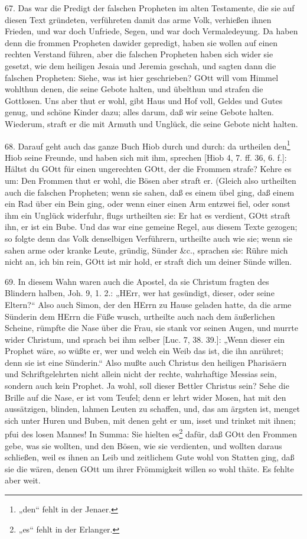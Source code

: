67. Das war die Predigt der falschen Propheten im alten Testamente, die sie auf diesen Text gründeten, verführeten damit das arme Volk, verhießen ihnen Frieden, und war doch Unfriede, Segen, und war doch Vermaledeyung. Da haben denn die frommen Propheten dawider gepredigt, haben sie wollen auf einen rechten Verstand führen, aber die falschen Propheten haben sich wider sie gesetzt, wie dem heiligen Jesaia und Jeremia geschah, und sagten dann die falschen Propheten: Siehe, was ist hier geschrieben? GOtt will vom Himmel wohlthun denen, die seine Gebote halten, und übelthun und strafen die Gottlosen. Uns aber thut er wohl, gibt Haus und Hof voll, Geldes und Gutes genug, und schöne Kinder dazu; alles darum, daß wir seine Gebote halten. Wiederum, straft er die mit Armuth und Unglück, die seine Gebote nicht halten.

68. Darauf geht auch das ganze Buch Hiob durch und durch: da urtheilen den\footnote{„den“ fehlt in der Jenaer.} Hiob seine Freunde, und haben sich mit ihm, sprechen [Hiob 4, 7. ff. 36, 6. f.]: Hältst du GOtt für einen ungerechten GOtt, der die Frommen strafe? Kehre es um: Den Frommen thut er wohl, die Bösen aber straft er. (Gleich also urtheilten auch die falschen Propheten; wenn sie sahen, daß es einem übel ging, daß einem ein Rad über ein Bein ging, oder wenn einer einen Arm entzwei fiel, oder sonst ihm ein Unglück widerfuhr, flugs urtheilten sie: Er hat es verdient, GOtt straft ihn, er ist ein Bube. Und das war eine gemeine Regel, aus diesem Texte gezogen; so folgte denn das Volk denselbigen Verführern, urtheilte auch wie sie; wenn sie sahen arme oder kranke Leute, gründig, Sünder \&c., sprachen sie: Rühre mich nicht an, ich bin rein, GOtt ist mir hold, er straft dich um deiner Sünde willen.

69. In diesem Wahn waren auch die Apostel, da sie Christum fragten des Blindern halben, Joh. 9, 1. 2.: „HErr, wer hat gesündigt, dieser, oder seine Eltern?“ Also auch Simon, der den HErrn zu Hause geladen hatte, da die arme Sünderin dem HErrn die Füße wusch, urtheilte auch nach dem äußerlichen Scheine, rümpfte die Nase über die Frau, sie stank vor seinen Augen, und murrte wider Christum, und sprach bei ihm selber [Luc. 7, 38. 39.]: „Wenn dieser ein Prophet wäre, so wüßte er, wer und welch ein Weib das ist, die ihn anrühret; denn sie ist eine Sünderin.“ Also mußte auch Christus den heiligen Pharisäern und Schriftgelehrten nicht allein nicht der rechte, wahrhaftige Messias sein, sondern auch kein Prophet. Ja wohl, soll dieser Bettler Christus sein? Sehe die Brille auf die Nase, er ist vom Teufel; denn er lehrt wider Mosen, hat mit den aussätzigen, blinden, lahmen Leuten zu schaffen, und, das am ärgsten ist, menget sich unter Huren und Buben, mit denen geht er um, isset und trinket mit ihnen; pfui des losen Mannes! In Summa: Sie hielten es\footnote{„es“ fehlt in der Erlanger.} dafür, daß GOtt den Frommen gebe, was sie wollten, und den Bösen, wie sie verdienten, und wollten daraus schließen, weil es ihnen an Leib und zeitlichem Gute wohl von Statten ging, daß sie die wären, denen GOtt um ihrer Frömmigkeit willen so wohl thäte. Es fehlte aber weit.

